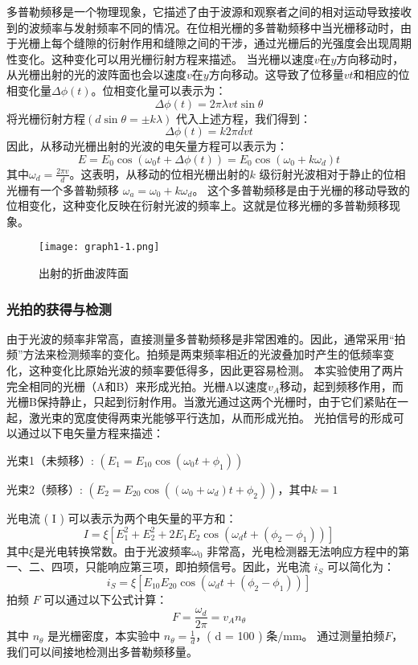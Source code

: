 \documentclass[dvipsnames, svgnames,a4paper,11pt]{article}
\begin{document}
		多普勒频移是一个物理现象，它描述了由于波源和观察者之间的相对运动导致接收到的波频率与发射频率不同的情况。在位相光栅的多普勒频移中当光栅移动时，由于光栅上每个缝隙的衍射作用和缝隙之间的干涉，通过光栅后的光强度会出现周期性变化。这种变化可以用光栅衍射方程来描述。
		当光栅以速度$ v $在$ y $方向移动时，从光栅出射的光的波阵面也会以速度$ v $在$ y $方向移动。这导致了位移量$ vt $和相应的位相变化量$  \Delta\phi(t) $。位相变化量可以表示为：
		\[
			\Delta \phi(t)=2\pi\lambda v t \sin \theta
		\]
		将光栅衍射方程$ ( d \sin\theta = \pm k\lambda )$ 代入上述方程，我们得到：
		\[
			\Delta \phi(t)=k 2 \pi d v t
		\]
		因此，从移动光栅出射的光波的电矢量方程可以表示为：
		\[
			E=E_0\cos(\omega_0t+\Delta \phi(t))=E_0\cos(\omega_0+k\omega_d)t
		\]
		其中$  \omega_d = \frac{2\pi v}{d} $。这表明，从移动的位相光栅出射的$k$ 级衍射光波相对于静止的位相光栅有一个多普勒频移 $ \omega_a = \omega_0 + k\omega_d $。
		这个多普勒频移是由于光栅的移动导致的位相变化，这种变化反映在衍射光波的频率上。这就是位移光栅的多普勒频移现象。

		\begin{figure}[htbp]
			\centering
			\texttt{[image: graph1-1.png]}
			\caption{出射的折曲波阵面}
			\label{fig:graph1-1}
		\end{figure}

	\subsubsection{光拍的获得与检测}

		由于光波的频率非常高，直接测量多普勒频移是非常困难的。因此，通常采用“拍频”方法来检测频率的变化。拍频是两束频率相近的光波叠加时产生的低频率变化，这种变化比原始光波的频率要低得多，因此更容易检测。
		本实验使用了两片完全相同的光栅（A和B）来形成光拍。光栅A以速度$  v_A  $移动，起到频移作用，而光栅B保持静止，只起到衍射作用。当激光通过这两个光栅时，由于它们紧贴在一起，激光束的宽度使得两束光能够平行迭加，从而形成光拍。
		光拍信号的形成可以通过以下电矢量方程来描述：
		
		光束1（未频移）: $( E_1 = E_{10} \cos(\omega_0 t + \phi_1) )$

		光束2（频移）: $ ( E_2 = E_{20} \cos((\omega_0 + \omega_d) t + \phi_2) )$，其中$ k = 1$ 
		
		光电流 ( I ) 可以表示为两个电矢量的平方和：
		\[
			I=\xi [E_{1}^2+E_{2}^2+2E_1E_2\cos(\omega_d t+(\phi_2-\phi_1))]
		\]
		其中$  \xi  $是光电转换常数。由于光波频率$  \omega_0 $ 非常高，光电检测器无法响应方程中的第一、二、四项，只能响应第三项，即拍频信号。因此，光电流 $ i_S $ 可以简化为：
		\[
			i_S=\xi[E_{10}E_{20}\cos(\omega_d t +(\phi_2-\phi_1))]
		\]
		拍频 $ F $ 可以通过以下公式计算：
		\[
			F=\frac{ω_d}{2\pi}​​=v_A​n_\theta​​
		\]
		其中 $ n_\theta $ 是光栅密度，本实验中 $ n_\theta = \frac{1}{d} $，( d = 100 ) 条/mm。
		通过测量拍频$  F $，我们可以间接地检测出多普勒频移量。
\end{document}
